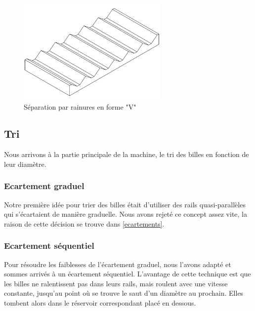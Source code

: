 
\begin{figure}
    \centering
    \includegraphics[width=0.65\textwidth]{Graphics/Rails/SEPARATEUR_V.pdf}
    \caption{Séparation par rainures en forme "V"}
\end{figure}

\subsection{Tri}
Nous arrivons à la partie principale de la machine, le tri des billes en fonction de leur diamètre.

\subsubsection{Ecartement graduel}
\label{ec_graduel}
Notre première idée pour trier des billes était d'utiliser des rails quasi-parallèles qui s'écartaient de manière graduelle. Nous avons rejeté ce concept assez vite, la raison de cette décision se trouve dans \ref{ecartements}.

\subsubsection{Ecartement séquentiel}
Pour résoudre les faiblesses de l'écartement graduel, nous l'avons adapté et sommes arrivés à un écartement séquentiel. L'avantage de cette technique est que les billes ne ralentissent pas dans leurs rails, mais roulent avec une vitesse constante, jusqu'au point où se trouve le saut d'un diamètre au prochain. Elles tombent alors dans le réservoir correspondant placé en dessous.


